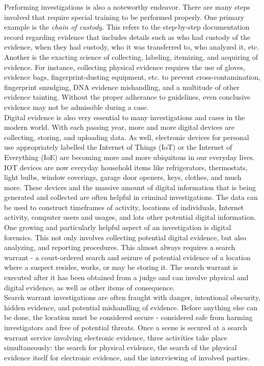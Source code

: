\documentclass[12pt]{article}
\begin{document}
Performing investigations is also a noteworthy endeavor.  There are many steps involved that require special
training to be performed properly.  One primary example is the {\em chain of custody}.  This refers to the 
step-by-step documentation record regarding evidence that includes details such as who had custody of
the evidence, when they had custody, who it was transferred to, who analyzed it, etc.
Another is the exacting
science of collecting, labeling, itemizing, and acquiring of evidence.
For instance, collecting physical evidence requires the
use of gloves,
evidence bags, fingerprint-dusting equipment, etc. to prevent cross-contamination, fingerprint smudging,
DNA evidence mishandling, and a multitude of other evidence tainting.  Without the proper adherance to 
guidelines,
even conclusive evidence may not be admissible during a case.\\

Digital evidence is also very essential to many investigations and cases in the modern world.
With each passing year, more and more digital devices are collecting, storing, and uploading data.  As
well, electronic devices for personal use appropriately labelled the Internet of Things (IoT) or
the Internet of Everything (IoE) are becoming more and more
ubiquitous in our everyday lives.  IOT devices are now everyday household items like refrigerators,
thermostats, light bulbs, window coverings, garage door openers, keys, clothes, and much more.
These devices and the massive amount of digital information that
is being generated and collected are often helpful in criminal investigations.  The data can be used to
construct timeframes of activity, locations of individuals, Internet activity, computer users and usages,
and lots other potential digital information.\\

One growing and particularly helpful aspect of an investigation is digital forensics.  This not only 
involves collecting potential digital evidence, but also analyzing, 
and reporting procedures.  This almost always requires a search warrant - a court-ordered search and
seizure of potential evidence of a location where a suspect resides, works, or may be storing it.
The search warrant is executed after it has been obtained from a judge and can involve physical and
digital evidence, as well as other items of consequence.\\

Search warrant investigations are often fraught with danger, intentional obscurity, hidden evidence, and
potential mishandling of evidence.  Before anything else can be done, the location must be considered
secure - considered safe from harming investigators and free of potential threats.  Once a scene is
secured at a search warrant service involving electronic evidence, three activities
take place simultaneously: the search for physical evidence, the search of the physical evidence
itself for electronic evidence, and the interviewing of involved parties.\\
\end{document}
